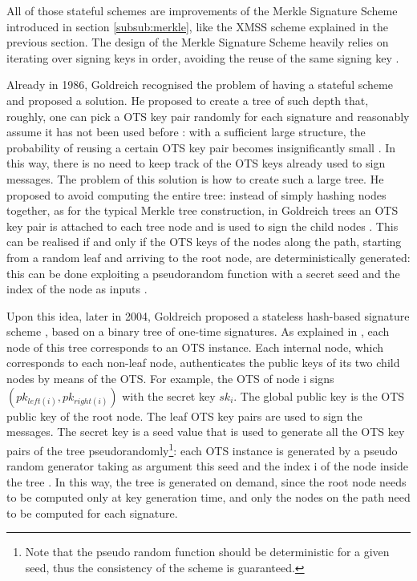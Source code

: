 \documentclass[a4paper,12pt]{article}
\begin{document}
All of those stateful schemes are improvements of the Merkle Signature Scheme introduced in section \ref{subsub:merkle}, like the XMSS scheme explained in the previous section.
The design of the Merkle Signature Scheme heavily relies on iterating over signing keys in order, avoiding the reuse of the same signing key \cite{3_SPHINCS_secondpaper}.

Already in 1986, Goldreich recognised the problem of having a stateful scheme and proposed a solution. He proposed to create a tree of such depth that, roughly, one can pick a OTS key pair randomly for each signature and reasonably assume it has not been used before \cite{3_SPHINCS_secondpaper}: with a sufficient large structure, the probability of reusing a certain OTS key pair becomes insignificantly small \cite{8_ARM}.
In this way, there is no need to keep track of the OTS keys already used to sign messages.
The problem of this solution is how to create such a large tree.
He proposed to avoid computing the entire tree: instead of simply hashing nodes together, as for the typical Merkle tree construction, in Goldreich trees an OTS key pair is attached to each tree node and is used to sign the child nodes \cite{8_ARM}. This can be realised if and only if the OTS keys of the nodes along the path, starting from a random leaf and arriving to the root node, are deterministically generated: this can be done exploiting a pseudorandom function with a secret seed and the index of the node as inputs \cite{8_ARM}.

Upon this idea, later in 2004, Goldreich proposed a stateless hash-based signature scheme \cite{50_Goldreich}, based on a binary tree of one-time signatures.
As explained in \cite{7_hashbased}, each node of this tree corresponds to an OTS instance. Each internal node, which corresponds to each non-leaf node, authenticates the public keys of its two child nodes by means of the OTS. For example, the OTS of node i signs $(pk_{left(i)}, pk_{right(i)})$ with the secret key $sk_{i}$. The global public key is the OTS public key of the root node.
The leaf OTS key pairs are used to sign the messages.
The secret key is a seed value that is used to generate all the OTS key pairs of the tree pseudorandomly\footnote{Note that the pseudo random function should be deterministic for a given seed, thus the consistency of the scheme is guaranteed.}: each OTS instance is generated by a pseudo random generator taking as argument this seed and the index i of the node inside the tree \cite{7_hashbased}.
In this way, the tree is generated on demand, since the root node needs to be computed only at key generation time, and only the nodes on the path need to be computed for each signature. 
\end{document}
